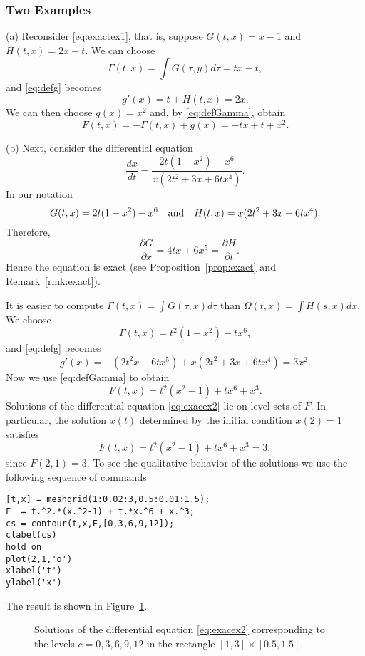 \documentclass{ximera}
\begin{document}
\subsubsection*{Two Examples}

\noindent (a) Reconsider \eqref{eq:exactex1}, that is, suppose $G(t,x)=x-1$ and 
$H(t,x)=2x-t$.  We can choose
\[
\Gamma(t,x)=\int G(\tau,y)d\tau = tx-t,
\]
and \eqref{eq:defg} becomes
\[
g'(x) = t + H(t,x) = 2x.
\]
We can then choose $g(x)=x^2$ and, by \eqref{eq:defGamma}, obtain
\[
F(t,x) = -\Gamma(t,x) + g(x) = -tx + t + x^2.
\]

\noindent (b) Next, consider the differential equation
\begin{equation}  \label{eq:exacex2}
\frac{dx}{dt} = \frac{2t(1-x^2)-x^6}{x(2t^2+3x+6tx^4)}.
\end{equation}
In our notation
\[
G(t,x) = 2t(1-x^2)-x^6 \quad\mbox{and}\quad H(t,x) = x(2t^2+3x+6tx^4).
\]
Therefore, 
\[
-\frac{\partial G}{\partial x} = 4tx + 6x^5 = 
\frac{\partial H}{\partial t}.
\]
Hence the equation is exact (see Proposition~\ref{prop:exact} and 
Remark~\ref{rmk:exact}).  

It is easier to compute $\Gamma(t,x)=\int G(\tau,x) d\tau$ than 
$\Omega(t,x)=\int H(s,x)dx$.  We choose 
\[
\Gamma(t,x) = t^2(1-x^2) - tx^6,
\]
and \eqref{eq:defg} becomes
\[
g'(x) = -(2t^2 x + 6tx^5) + x(2t^2+3x+6tx^4) = 3x^2.
\]
Now we use \eqref{eq:defGamma} to obtain
\[
F(t,x) = t^2(x^2-1) + tx^6 + x^3.
\]
Solutions of the differential equation \eqref{eq:exacex2} lie on
level sets of $F$.  In particular, the solution $x(t)$
determined by the initial condition $x(2)=1$ satisfies 
\[
F(t,x)=t^2(x^2-1) + tx^6 + x^3 = 3,
\]
since $F(2,1)=3$.  To see the qualitative behavior of the
solutions we use the following sequence 
of \Matlab commands
\begin{verbatim}
[t,x] = meshgrid(1:0.02:3,0.5:0.01:1.5);
F  = t.^2.*(x.^2-1) + t.*x.^6 + x.^3;
cs = contour(t,x,F,[0,3,6,9,12]);
clabel(cs)
hold on
plot(2,1,'o')                  
xlabel('t')
ylabel('x')
\end{verbatim}
The result is shown in Figure~\ref{Fig:contour3}.  

\begin{figure}[htb]
  \centerline{%
  }
  \caption{Solutions of the differential equation
\protect\eqref{eq:exacex2}
  corresponding to the levels $c=0,3,6,9,12$ in the rectangle
  $[1,3]\times [0.5,1.5]$.}
\label{Fig:contour3}
\end{figure}
\end{document}
